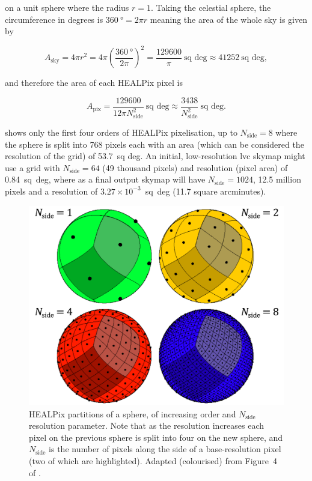 \begin{colsection}
\begin{colsection}
on a unit sphere where the radius $r=1$. Taking the celestial sphere, the circumference in degrees is $\SI{360}{\degree} = 2 \pi r$ meaning the area of the whole sky is given by

\begin{equation}
    A_\text{sky} = 4 \pi r^2 = 4 \pi \left ( \frac{\SI{360}{\degree}}{2 \pi} \right )^2 = \frac{129600}{\pi}~\text{sq deg} \approx 41252~\text{sq deg} , %
    \label{eq:sky_area}
\end{equation}

and therefore the area of each HEALPix pixel is

\begin{equation}
    A_\text{pix} = \frac{129600}{12 \pi N_\text{side}^2}~\text{sq~deg} \approx \frac{3438}{N_\text{side}^2}~\text{sq~deg}.
    \label{eq:healpix_area_degrees}
\end{equation}

 shows only the first four orders of HEALPix pixelisation, up to $N_\text{side} = 8$ where the sphere is split into 768 pixels each with an area (which can be considered the resolution of the grid) of 53.7~sq deg. An initial, low-resolution \gls{lvc} skymap might use a grid with $N_\text{side} = 64$ (49 thousand pixels) and resolution (pixel area) of 0.84~sq~deg, where as a final output skymap will have $N_\text{side} = 1024$, 12.5 million pixels and a resolution of $3.27 \times 10^{-3}$~sq~deg (11.7 square arcminutes).

\begin{figure}[t]
    \begin{center}
        \includegraphics[width=0.7\linewidth]{images/healpix.pdf}
    \end{center}
    \caption[HEALPix partitions of a sphere]{
        HEALPix partitions of a sphere, of increasing order and $N_\text{side}$ resolution parameter. Note that as the resolution increases each pixel on the previous sphere is split into four on the new sphere, and $N_\text{side}$ is the number of pixels along the side of a base-resolution pixel (two of which are highlighted). Adapted (colourised) from Figure~4 of \citet{HEALPix}.
    }\label{fig:healpix}
\end{figure}


\end{colsection}
\end{colsection}
